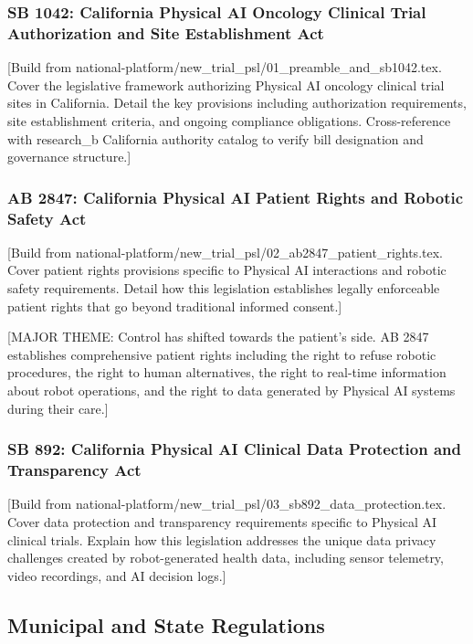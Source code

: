 \subsubsection{SB 1042: California Physical AI Oncology Clinical Trial
Authorization and Site Establishment Act}
[Build from national-platform/new\_trial\_psl/01\_preamble\_and\_sb1042.tex.
Cover the legislative framework authorizing Physical AI oncology clinical trial
sites in California. Detail the key provisions including authorization
requirements, site establishment criteria, and ongoing compliance obligations.
Cross-reference with research\_b California authority catalog to verify
bill designation and governance structure.]

\subsubsection{AB 2847: California Physical AI Patient Rights and Robotic
Safety Act}
[Build from national-platform/new\_trial\_psl/02\_ab2847\_patient\_rights.tex.
Cover patient rights provisions specific to Physical AI interactions and
robotic safety requirements. Detail how this legislation establishes legally
enforceable patient rights that go beyond traditional informed consent.]

[MAJOR THEME: Control has shifted towards the patient's side. AB 2847
establishes comprehensive patient rights including the right to refuse robotic
procedures, the right to human alternatives, the right to real-time information
about robot operations, and the right to data generated by Physical AI systems
during their care.]

\subsubsection{SB 892: California Physical AI Clinical Data Protection and
Transparency Act}
[Build from national-platform/new\_trial\_psl/03\_sb892\_data\_protection.tex.
Cover data protection and transparency requirements specific to Physical AI
clinical trials. Explain how this legislation addresses the unique data
privacy challenges created by robot-generated health data, including sensor
telemetry, video recordings, and AI decision logs.]

\subsection{Municipal and State Regulations}
\label{subsec:site-regulations}

